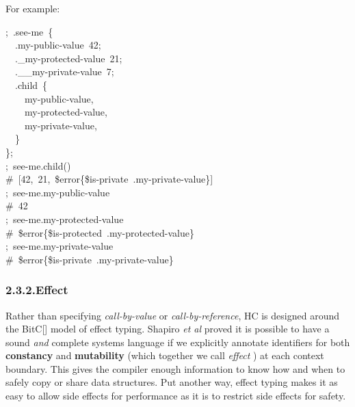 \documentclass[preprint]{{acmart}}
\begin{document}
\noindent{}For example:%
\begin{mdpre}%
\noindent;~.see-me~\{\\
~~.my-public-value~{42};\\
~~.\_my-protected-value~{21};\\
~~.\_\_my-private-value~7;\\
~~.child~\{\\
~~~~my-public-value,\\
~~~~my-protected-value,\\
~~~~my-private-value,\\
~~\}\\
\};\\
;~see-me.child()\\
{\#~{}[42,~21,~\$error\{\$is-private~.my-private-value\}]}\\
;~see-me.my-public-value\\
{\#~42}\\
;~see-me.my-protected-value\\
{\#~\$error\{\$is-protected~.my-protected-value\}}\\
;~see-me.my-private-value\\
{\#~\$error\{\$is-private~.my-private-value\}}\\
\end{mdpre}
\subsubsection{2.3.2.\hspace*{0.5em}Effect}\label{sec-effect}%

\noindent{}Rather than specifying \emph{call-by-value} or \emph{call-by-reference}, HC is
designed around the BitC[] model of effect typing. Shapiro \emph{et al}
proved it is possible to have a sound \emph{and} complete systems language if
we explicitly annotate identifiers for both \textbf{constancy} and
\textbf{mutability} (which together we call \emph{effect} ) at each context
boundary. This gives the compiler enough information to know how and when
to safely copy or share data structures. Put another way, effect typing
makes it as easy to allow side effects for performance as it is to
restrict side effects for safety.%
\end{document}
